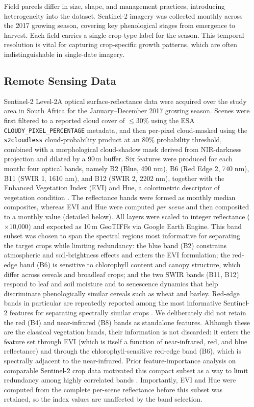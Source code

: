 \documentclass[pdflatex,sn-mathphys]{sn-jnl} %
\begin{document}
Field parcels differ in size, shape, and management practices, introducing heterogeneity into the dataset. Sentinel-2 imagery was collected monthly across the 2017 growing season, covering key phenological stages from emergence to harvest. Each field carries a single crop-type label for the season. This temporal resolution is vital for capturing crop-specific growth patterns, which are often indistinguishable in single-date imagery.


\subsection{Remote Sensing Data}

Sentinel-2 Level-2A optical surface-reflectance data were acquired over the study area in South Africa for the January–December 2017 growing season. Scenes were first filtered to a reported cloud cover of $\leq 30\%$ using the ESA \texttt{CLOUDY\_PIXEL\_PERCENTAGE} metadata, and then per-pixel cloud-masked using the \texttt{s2cloudless} cloud-probability product at an 80\% probability threshold, combined with a morphological cloud-shadow mask derived from NIR-darkness projection and dilated by a 90\,m buffer. Six features were produced for each month: four optical bands, namely B2 (Blue, 490 nm), B6 (Red Edge 2, 740 nm), B11 (SWIR 1, 1610 nm), and B12 (SWIR 2, 2202 nm), together with the Enhanced Vegetation Index (EVI) and Hue, a colorimetric descriptor of vegetation condition \cite{mann2023}. The reflectance bands were formed as monthly median composites, whereas EVI and Hue were computed \emph{per scene} and then composited to a monthly value (detailed below). All layers were scaled to integer reflectance ($\times$10{,}000) and exported as 10\,m GeoTIFFs via Google Earth Engine. This band subset was chosen to span the spectral regions most informative for separating the target crops while limiting redundancy: the blue band (B2) constrains atmospheric and soil-brightness effects and enters the EVI formulation; the red-edge band (B6) is sensitive to chlorophyll content and canopy structure, which differ across cereals and broadleaf crops; and the two SWIR bands (B11, B12) respond to leaf and soil moisture and to senescence dynamics that help discriminate phenologically similar cereals such as wheat and barley. Red-edge bands in particular are repeatedly reported among the most informative Sentinel-2 features for separating spectrally similar crops \cite{tufail2025cnnrnn,mahlayeye2024}. We deliberately did not retain the red (B4) and near-infrared (B8) bands as standalone features. Although these are the classical vegetation bands, their information is not discarded: it enters the feature set through EVI (which is itself a function of near-infrared, red, and blue reflectance) and through the chlorophyll-sensitive red-edge band (B6), which is spectrally adjacent to the near-infrared. Prior feature-importance analysis on comparable Sentinel-2 crop data motivated this compact subset as a way to limit redundancy among highly correlated bands \cite{mann2023}. Importantly, EVI and Hue were computed from the complete per-scene reflectance before this subset was retained, so the index values are unaffected by the band selection.
\end{document}
